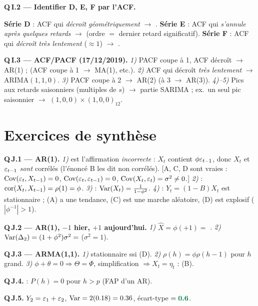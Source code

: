 \documentclass[11pt]{article}
\begin{document}
\textbf{Q\,I.2 --- Identifier D, E, F par l'ACF.}
\begin{reponse}
\textbf{Série D} : ACF qui \emph{décroît géométriquement} $\to$ .
\textbf{Série E} : ACF qui \emph{s'annule après quelques retards} $\to$  (ordre $=$
dernier retard significatif). \textbf{Série F} : ACF qui \emph{décroît très lentement}
($\approx1$) $\to$ .
\end{reponse}

\textbf{Q\,I.3 --- ACF/PACF (17/12/2019).}
\emph{1)} PACF coupe à 1, ACF décroît $\to$ AR(1) ; (ACF coupe à 1 $\to$ MA(1), etc.).
\emph{2)} ACF qui décroît \emph{très lentement} $\to$ ARIMA$(1,1,0)$.
\emph{3)} PACF coupe à 2 $\to$ AR(2) (à 3 $\to$ AR(3)).
\emph{4)--5)} Pics aux retards saisonniers (multiples de $s$) $\to$ partie SARIMA ; ex.\ un seul
pic saisonnier $\to$ $(1,0,0)\times(1,0,0)_{12}$.

\section{Exercices de synthèse}

\textbf{Q\,J.1 --- AR(1).}
\emph{1)}  est l'affirmation \emph{incorrecte} : $X_t$ contient $\phi\varepsilon_{t-1}$,
donc $X_t$ et $\varepsilon_{t-1}$ \emph{sont} corrélés (l'énoncé B les dit non corrélés). [A, C, D
sont vraies : $\operatorname{Cov}(\varepsilon_t,X_{t-1})=0$, $\operatorname{Cov}(\varepsilon_t,\varepsilon_{t-1})=0$, $\operatorname{Cov}(X_t,\varepsilon_t)=\sigma^2\ne0$.]
\emph{2)}  : $\operatorname{cor}(X_t,X_{t-1})=\rho(1)=\phi$.
\emph{3)}  : $\operatorname{Var}(X_t)=\frac{1}{1-\phi^2}$.
\emph{4)}  : $Y_t=(1-B)X_t$ est stationnaire ; (A) a une tendance, (C) est une
marche aléatoire, (D) est explosif ($|\phi^{-1}|>1$).

\textbf{Q\,J.2 --- AR(1), $-1$ hier, $+1$ aujourd'hui.}
\emph{1)} $\widehat X=\phi(+1)=$ .
\emph{2)} $\operatorname{Var}(\Delta_2)=(1+\phi^2)\sigma^2=$  ($\sigma^2=1$).

\textbf{Q\,J.3 --- ARMA(1,1).}
\emph{1)} stationnaire ssi  (D). \emph{2)}  $\rho(h)=\phi\rho(h-1)$
pour $h$ grand. \emph{3)} $\phi+\theta=0\Rightarrow\Theta=\Phi$, simplification $\Rightarrow
X_t=\eta_t$ :  (B).

\textbf{Q\,J.4.}  : $P(h)=0$ pour $h>p$ (FAP d'un AR).

\textbf{Q\,J.5.} $Y_2=\varepsilon_1+\varepsilon_2$, $\operatorname{Var}=2(0.18)=0.36$, écart-type $=\bonne{0.6}$.
\end{document}
